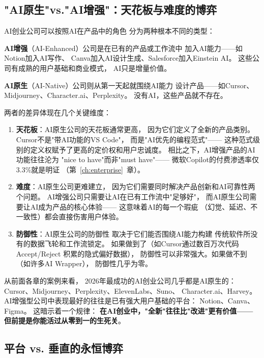 \subsection{"AI原生"vs."AI增强"：天花板与难度的博弈}

AI创业公司可以按照AI在产品中的角色
分为两种根本不同的类型：

\textbf{AI增强}（AI-Enhanced）公司是在已有的产品或工作流中
加入AI能力——如Notion加入AI写作、
Canva加入AI设计生成、Salesforce加入Einstein AI。
这些公司有成熟的用户基础和商业模式，
AI只是增量价值。

\textbf{AI原生}（AI-Native）公司则从第一天起就围绕AI能力
设计产品——如Cursor、Midjourney、Character.ai、Perplexity。
没有AI，这些产品就不存在。

两者的差异体现在几个关键维度：

\begin{enumerate}
  \item \textbf{天花板}：AI原生公司的天花板通常更高，
    因为它们定义了全新的产品类别。
    Cursor不是"带AI功能的VS Code"，
    而是"AI优先的编程范式"——
    这种范式级别的定义权赋予了更高的定价权和用户忠诚度。
    相比之下，AI增强产品的AI功能往往沦为
    "nice to have"而非"must have"——
    微软Copilot的付费渗透率仅3.3\%就是明证
    （第~\ref{ch:enterprise}~章）。

  \item \textbf{难度}：AI原生公司更难建立，
    因为它们需要同时解决产品创新和AI可靠性两个问题。
    AI增强公司只需要让AI在已有工作流中"足够好"，
    而AI原生公司需要让AI成为产品的核心体验——
    这意味着AI的每一个瑕疵
    （幻觉、延迟、不一致性）都会直接伤害用户体验。

  \item \textbf{防御性}：AI原生公司的防御性
    取决于它们能否围绕AI能力构建
    传统软件所没有的数据飞轮和工作流锁定。
    如果做到了（如Cursor通过数百万次代码Accept/Reject
    积累的隐式偏好数据），
    防御性可以非常强大。如果做不到（如许多AI Wrapper），
    防御性几乎为零。
\end{enumerate}

从前面各章的案例来看，
2026年最成功的AI创业公司几乎都是AI原生的：
Cursor、Midjourney、Perplexity、ElevenLabs、Suno、
Character.ai、Harvey。
AI增强型公司中表现最好的往往是已有强大用户基础的平台：
Notion、Canva、Figma。
这暗示着一个规律：
\textbf{在AI创业中，"全新"往往比"改进"更有价值——
但前提是你能活过从零到一的生死关}。


\subsection{平台 vs. 垂直的永恒博弈}

